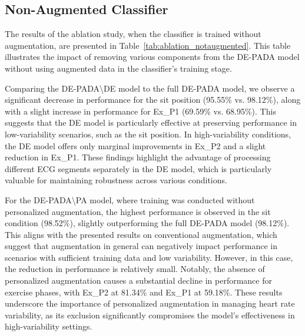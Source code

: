 \subsection{Non-Augmented Classifier}
The results of the ablation study, when the classifier is trained without augmentation, are presented in Table~\ref{tab:ablation_notaugmented}.
This table illustrates the impact of removing various components from the DE-PADA model without using augmented data in the classifier's training stage.

Comparing the DE-PADA\textbackslash DE model to the full DE-PADA model, we observe a significant decrease in performance for the sit position (95.55\% vs. 98.12\%), along with a slight increase in performance for Ex\_P1 (69.59\% vs. 68.95\%).
This suggests that the DE model is particularly effective at preserving performance in low-variability scenarios, such as the sit position.
In high-variability conditions, the DE model offers only marginal improvements in Ex\_P2 and a slight reduction in Ex\_P1.
These findings highlight the advantage of processing different ECG segments separately in the DE model, which is particularly valuable for maintaining robustness across various conditions.

For the DE-PADA\textbackslash PA model, where training was conducted without personalized augmentation, the highest performance is observed in the sit condition (98.52\%), slightly outperforming the full DE-PADA model (98.12\%). This aligns with the presented results on conventional augmentation, which suggest that augmentation in general can negatively impact performance in scenarios with sufficient training data and low variability. However, in this case, the reduction in performance is relatively small. Notably, the absence of personalized augmentation causes a substantial decline in performance for exercise phases, with Ex\_P2 at 81.34\% and Ex\_P1 at 59.18\%. These results underscore the importance of personalized augmentation in managing heart rate variability, as its exclusion significantly compromises the model's effectiveness in high-variability settings.


